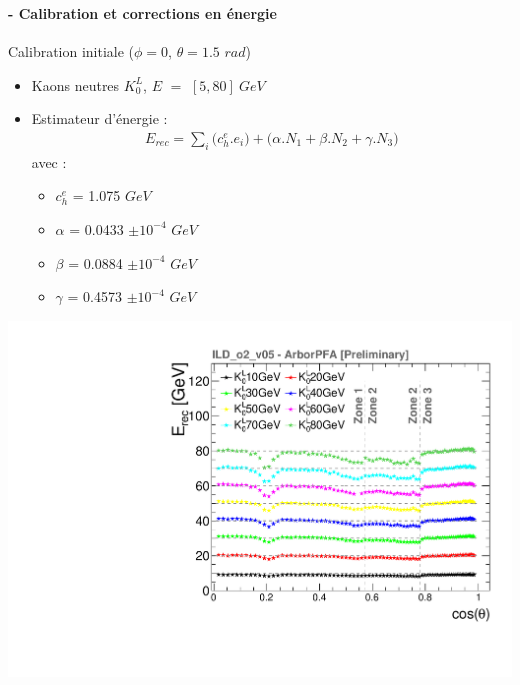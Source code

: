 \documentclass[8pt]{beamer}
\begin{document}
  \begin{frame}
  \frametitle{\secname}
  \framesubtitle{\subsecname - Calibration et corrections en énergie}
    \begin{minipage}{0.6\linewidth}
      \begin{block}{Calibration initiale ($\phi=0$, $\theta=1.5$ $rad$)}
        \begin{itemize}
          \item Kaons neutres $K_{0}^{L}$, $E$ $=$ $[5, 80]~GeV$
          \item Estimateur d'énergie :
          \begin{align*}
            E_{rec} = \sum_{i} \big(c_{h}^{e}.e_i\big) + \big(\alpha.N_1 + \beta.N_2 + \gamma.N_3\big)
          \end{align*}
          avec :
          \begin{itemize}
            \item $c_{h}^{e}$ = 1.075 $GeV$
            \item $\alpha$ = 0.0433 $\pm 10^{-4}$ $GeV$
            \item $\beta$  = 0.0884  $\pm 10^{-4}$ $GeV$
            \item $\gamma$ = 0.4573  $\pm 10^{-4}$ $GeV$
          \end{itemize}
        \end{itemize}
      \end{block}
      \begin{center}
        \includegraphics[width=0.6\linewidth]{ERec_thesis.pdf}
      \end{center}
    \end{minipage} \hfill
    \begin{minipage}{0.39\linewidth}
      \begin{center}

\end{center}
\end{minipage}
\end{frame}
\end{document}
